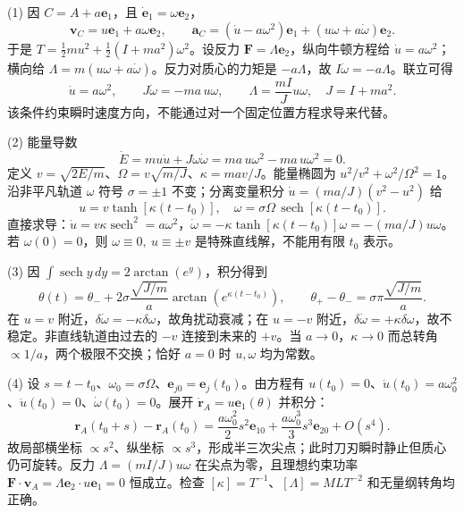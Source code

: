 (1) 因 \(C=A+a\mathbf e_1\)，且 \(\dot{\mathbf e}_1=\omega\mathbf e_2\)，
\[
\mathbf v_C=u\mathbf e_1+a\omega\mathbf e_2,\qquad
\mathbf a_C=(\dot u-a\omega^2)\mathbf e_1+(u\omega+a\dot\omega)\mathbf e_2.
\]
于是 \(T=\tfrac12m u^2+\tfrac12(I+ma^2)\omega^2\)。设反力 \(\mathbf F=\Lambda\mathbf e_2\)，纵向牛顿方程给 \(\dot u=a\omega^2\)；横向给 \(\Lambda=m(u\omega+a\dot\omega)\)。反力对质心的力矩是 \(-a\Lambda\)，故 \(I\dot\omega=-a\Lambda\)。联立可得
\[
\boxed{\dot u=a\omega^2,\qquad J\dot\omega=-ma\,u\omega,\qquad
\Lambda=\frac{mI}{J}u\omega},\quad J=I+ma^2.
\]
该条件约束瞬时速度方向，不能通过对一个固定位置方程求导来代替。

(2) 能量导数
\[
\dot E=mu\dot u+J\omega\dot\omega
=ma\,u\omega^2-ma\,u\omega^2=0.
\]
定义 \(v=\sqrt{2E/m}\)、\(\Omega=v\sqrt{m/J}\)、\(\kappa=mav/J\)。能量椭圆为 \(u^2/v^2+\omega^2/\Omega^2=1\)。沿非平凡轨道 \(\omega\) 符号 \(\sigma=\pm1\) 不变；分离变量积分 \(\dot u=(ma/J)(v^2-u^2)\) 给
\[
\boxed{u=v\tanh[\kappa(t-t_0)],\quad
\omega=\sigma\Omega\,\operatorname{sech}[\kappa(t-t_0)]}.
\]
直接求导：\(\dot u=v\kappa\operatorname{sech}^2=a\omega^2\)，\(\dot\omega=-\kappa\tanh[\kappa(t-t_0)]\omega=-(ma/J)u\omega\)。若 \(\omega(0)=0\)，则 \(\omega\equiv0,\ u\equiv\pm v\) 是特殊直线解，不能用有限 \(t_0\) 表示。

(3) 因 \(\int\operatorname{sech}y\,dy=2\arctan(e^y)\)，积分得到
\[
\boxed{\theta(t)=\theta_-+2\sigma\frac{\sqrt{J/m}}a
\arctan(e^{\kappa(t-t_0)})},\qquad
\boxed{\theta_+-\theta_-=\sigma\pi\frac{\sqrt{J/m}}a}.
\]
在 \(u=v\) 附近，\(\delta\dot\omega=-\kappa\delta\omega\)，故角扰动衰减；在 \(u=-v\) 附近，\(\delta\dot\omega=+\kappa\delta\omega\)，故不稳定。非直线轨道由过去的 \(-v\) 连接到未来的 \(+v\)。当 \(a\to0\)，\(\kappa\to0\) 而总转角 \(\propto1/a\)，两个极限不交换；恰好 \(a=0\) 时 \(u,\omega\) 均为常数。

(4) 设 \(s=t-t_0\)、\(\omega_0=\sigma\Omega\)、\(\mathbf e_{j0}=\mathbf e_j(t_0)\)。由方程有 \(u(t_0)=0\)、\(\dot u(t_0)=a\omega_0^2\)、\(\ddot u(t_0)=0\)、\(\dot\omega(t_0)=0\)。展开 \(\dot{\mathbf r}_A=u\mathbf e_1(\theta)\) 并积分：
\[
\boxed{\mathbf r_A(t_0+s)-\mathbf r_A(t_0)
=\frac{a\omega_0^2}{2}s^2\mathbf e_{10}
+\frac{a\omega_0^3}{3}s^3\mathbf e_{20}+O(s^4)}.
\]
故局部横坐标 \(\propto s^2\)、纵坐标 \(\propto s^3\)，形成半三次尖点；此时刀刃瞬时静止但质心仍可旋转。反力 \(\Lambda=(mI/J)u\omega\) 在尖点为零，且理想约束功率 \(\mathbf F\cdot\mathbf v_A=\Lambda\mathbf e_2\cdot u\mathbf e_1=0\) 恒成立。检查 \([\kappa]=T^{-1}\)、\([\Lambda]=MLT^{-2}\) 和无量纲转角均正确。
